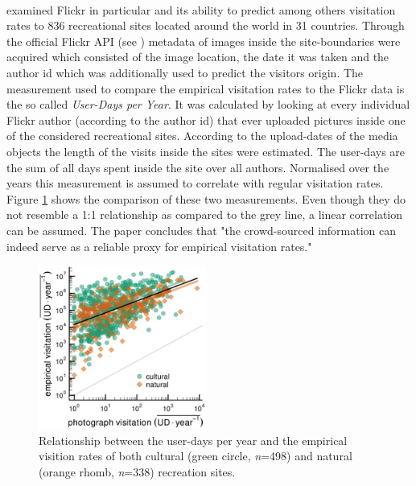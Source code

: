 \paragraph*{\textcite{Wood2013}} examined Flickr in particular and its ability to predict among others visitation rates to 836 recreational sites located around the world in 31 countries. Through the official Flickr API (see ) metadata of images inside the site-boundaries were acquired which consisted of the image location, the date it was taken and the author id which was additionally used to predict the visitors origin. The measurement used to compare the empirical visitation rates to the Flickr data is the so called \textit{User-Days per Year}. It was calculated by looking at every individual Flickr author (according to the author id) that ever uploaded pictures inside one of the considered recreational sites. According to the upload-dates of the media objects the length of the visits inside the sites were estimated. The user-days are the sum of all days spent inside the site over all authors. Normalised over the years this measurement is assumed to correlate with regular visitation rates. \\
Figure \ref{fig:wood_user_days} shows the comparison of these two measurements. Even though they do not resemble a 1:1 relationship as compared to the grey line, a linear correlation can be assumed. The paper concludes that "the crowd-sourced information can indeed serve as a reliable proxy for empirical visitation rates."
\begin{figure}[h]
   \begin{center}
   \includegraphics[width=0.49\textwidth]{img/wood_user_photodays.pdf}
   \end{center}
   \caption{Relationship between the user-days per year and the empirical visition rates of both cultural (green circle, \textit{n}=498) and natural (orange rhomb, \textit{n}=338) recreation sites.}
   \label{fig:wood_user_days}
\end{figure}


